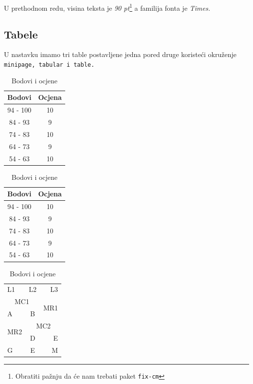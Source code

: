 \documentclass[letter paper]{article}
\begin{document}
\normalsize{}



\noindent U prethodnom redu, visina teksta je \textsl{90 pt}\footnote{Obratiti pažnju da će nam trebati paket \texttt{fix-cm}} a familija fonta je \textit{Times.}


\subsection{Tabele}

U nastavku imamo tri table postavljene jedna pored druge koristeći okruženje \texttt{\color{blue}minipage\color{black}, \color{blue} tabular \color{black}i \color{blue} table.}



\begin{table}[h]

\renewcommand{\arraystretch}{1.3}

\begin{minipage}[b]{0.33\textwidth}


\centering
\begin{tabular} {c c}
\hline \hline
Bodovi & Ocjena \\ \hline
94 - 100 & 10 \\
84 - 93 & 9\\
74 - 83 & 10 \\
64 - 73 & 9 \\
54 - 63 & 10 \\
\hline
\end{tabular}
\caption{Bodovi i ocjene}
\label{tabela:tab1}
\end{minipage}
{}
\begin{minipage}[b]{0.33\textwidth}
\centering
\begin{tabular} {c c}
\hline \hline
\rowcolor[RGB]{77,77,77}\color{white}Bodovi & \color{white}Ocjena \\ \hline
94 - 100 & 10 \\
\rowcolor[RGB]{235,229,229}84 - 93 & 9\\
74 - 83 & 10 \\
\rowcolor[RGB]{235,229,229}64 - 73 & 9 \\
54 - 63 & 10 \\
\hline \hline
\end{tabular}
\caption{Bodovi i ocjene}
\label{tabela:tab2}
\end{minipage}
{}
\begin{minipage}[b]{0.33\textwidth}
\centering
\begin{tabular} {|l|c|r|}
\hline \hline 
 \cellcolor[RGB]{204,255,204}L1 & L2 & L3 \\ \cline{3-3}
  \multicolumn{2}{c}{\cellcolor[RGB]{204,204,255}MC1}\vline & \multirow{2}{*}{MR1}  \\ \cline{1-2}
  A & B &  \\ \hline
  \multirow{2}{*}{MR2} & \multicolumn{2}{c}{MC2} \vline \\ \cline{2-2}
   & D & \cellcolor[RGB]{255,229,204} E \\ \hline
  G & \cellcolor[RGB]{255,204,204}E & M \\ \hline \hline


\end{tabular}
\end{minipage}
\end{table}
\end{document}

